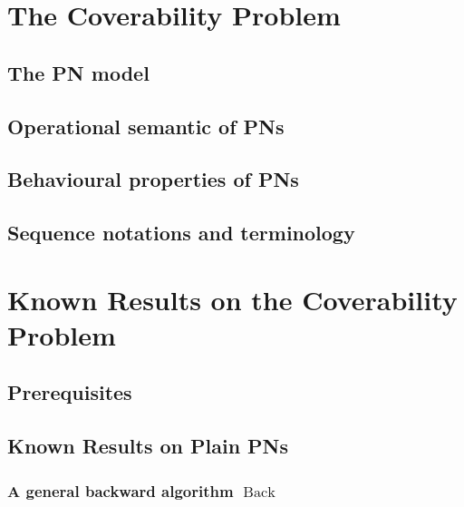 \documentclass[11pt,a4paper,oneside]{book}
\theoremstyle{plain}
\theoremstyle{definition}
\theoremstyle{remark}
\DeclareMathOperator{\back}{Back}
\begin{document}
\acresetall

\chapter{The Coverability Problem}
\label{sec:the-coverability-problem}

%
\section{The \ac{PN} model}
\label{sec:the-pn-model}


%
\section{Operational semantic of \acp{PN}}
\label{sec:operational-semantic-of-pn}


%
\section{Behavioural properties of \acp{PN}}
\label{sec:behavioural-properties-of-pn}


%
\section{Sequence notations and terminology}
\label{sec:sequence-notations-and-terminology}


\chapter{Known Results on the Coverability Problem}
\label{sec:known-results-on-the-coverability-problem}


%
\section{Prerequisites}
\label{sec:prerequisites}


%
\section{Known Results on Plain \acp{PN}}
\label{sec:known-results-on-plain-pn}
\subsection{A general backward algorithm $\back$}
\label{sec:a-general-backward-algorithm-back}
\label{sec:backward-algorithm}

\end{document}
